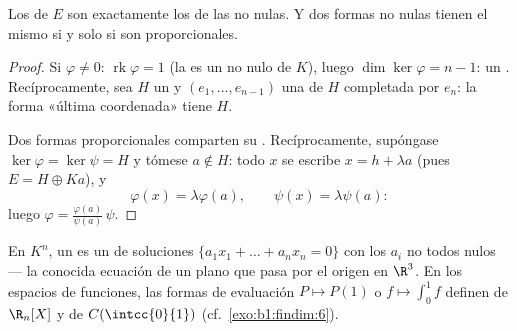 \begin{theorem}\label{thm:b1:linmaps:hyperplanes}
Los  de $E$ son exactamente los  de las
 no nulas. Y dos formas no nulas tienen el mismo
 si y solo si son proporcionales.
\end{theorem}

\begin{proof}
Si $\varphi \neq 0$: $\operatorname{rk}\varphi = 1$ (la  es un
 no nulo de $K$), luego $\dim\ker\varphi = n - 1$: un
. Recíprocamente, sea $H$ un  y
$(e_1, \dots, e_{n-1})$ una  de $H$ completada por $e_n$: la
forma «última coordenada» tiene  $H$.

Dos formas proporcionales comparten su . Recíprocamente,
supóngase $\ker\varphi = \ker\psi = H$ y tómese $a \notin H$: todo
$x$ se escribe $x = h + \lambda a$ (pues $E = H \oplus Ka$), y
\[
\varphi(x) = \lambda \varphi(a), \qquad \psi(x) = \lambda\psi(a):
\]
luego $\varphi = \frac{\varphi(a)}{\psi(a)}\,\psi$.
\end{proof}

\begin{example}\label{ex:b1:linmaps:hyperplane}
En $K^n$, un  es un  de soluciones
$\{a_1 x_1 + \dots + a_n x_n = 0\}$ con los $a_i$ no todos nulos ---
la conocida ecuación de un plano que pasa por el origen en $\R^3$. En
los espacios de funciones, las formas de evaluación $P \mapsto P(1)$
o $f \mapsto \int_0^1 f$ definen  de $\R_n[X]$ y de
$C(\intcc{0}{1})$ (cf.\ \cref{exo:b1:findim:6}).
\end{example}

